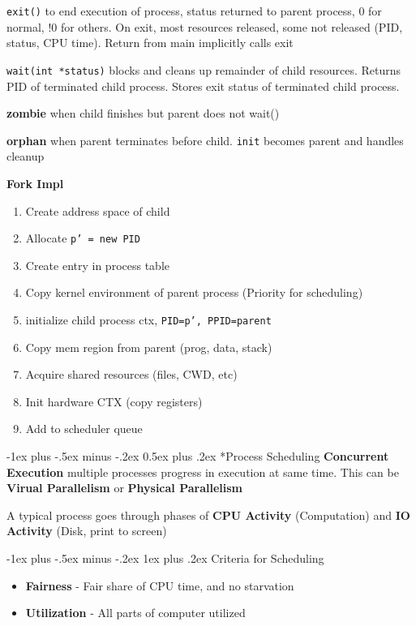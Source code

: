 \documentclass[10pt,landscape]{article}
\makeatletter
\renewcommand{\section}{\@startsection{section}{1}{0mm}%
  {-1ex plus -.5ex minus -.2ex}%
  {0.5ex plus .2ex}%
{\normalfont\large\bfseries}}
\renewcommand{\subsubsection}{\@startsection{subsubsection}{3}{0mm}%
  {-1ex plus -.5ex minus -.2ex}%
  {1ex plus .2ex}%
{\normalfont\small\bfseries}}%
\makeatother
\begin{document}
\begin{multicols*}{4}
  \texttt{exit()} to end execution of process, status returned to parent process, 0 for normal, !0 for others. On exit, most resources released, some not released (PID, status, CPU time). Return from main implicitly calls exit

  \texttt{wait(int *status)} blocks and cleans up remainder of child resources. Returns PID of terminated child process. Stores exit status of terminated child process. 

  \textbf{zombie} when child finishes but parent does not wait()

  \textbf{orphan} when parent terminates before child. \texttt{init} becomes parent and handles cleanup

  \textbf{Fork Impl}
  \begin{enumerate}
    \item Create address space of child
    \item Allocate \texttt{p' = new PID}
    \item Create entry in process table
    \item Copy kernel environment of parent process (Priority for scheduling)
    \item initialize child process ctx, \texttt{PID=p', PPID=parent}
    \item Copy mem region from parent (prog, data, stack)
    \item Acquire shared resources (files, CWD, etc)
    \item Init hardware CTX (copy registers)
    \item Add to scheduler queue
  \end{enumerate}

  \section*{Process Scheduling}
  \textbf{Concurrent Execution} multiple processes progress in execution at same time. This can be \textbf{Virual Parallelism} or \textbf{Physical Parallelism}

  A typical process goes through phases of \textbf{CPU Activity} (Computation) and \textbf{IO Activity} (Disk, print to screen)

  \subsubsection{Criteria for Scheduling}
  \begin{itemize}
    \item \textbf{Fairness} - Fair share of CPU time, and no starvation
    \item \textbf{Utilization} - All parts of computer utilized
  \end{itemize}

\end{multicols*}
\end{document}
